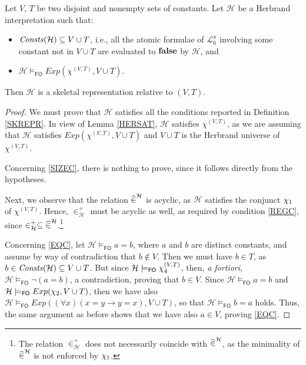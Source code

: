 \documentclass[manyauthors]{fundam}
\newcommand{\Elpizero}{\ensuremath{\mathcal{L}_{0}^{\pi}}\xspace}
\newcommand{\HExp}{Exp}
\newcommand{\memclosure}[1]{\in_{#1}^{+}}
\newcommand{\seteq}[2]{#1=#2}
\newcommand{\consta}{a}
\newcommand{\constb}{b}
\newcommand{\hinter}{\ensuremath{\mathcal{H}}}
\newcommand{\fomodels}[2]{#1 \models_{\mathsf{FO}} #2}
\begin{document}
\begin{lemma}\label{HERTOSK}
Let $V$, $T$ be two disjoint and nonempty sets of constants.
Let $\hinter$ be a Herbrand interpretation such that:
\begin{itemize}
  \item $\Consts(\hinter)\subseteq V \cup T$, i.e.,
  all the atomic formulae of $\Elpizero$ involving some constant not in
  $V \cup T$ are evaluated to $\mathbf{false}$ by $\hinter$, and
  \item $\fomodels{\hinter}{\HExp(\chi^{(V,T)}, V \cup T)}$.
\end{itemize}
Then $\hinter$ is a skeletal representation relative to $(V,T)$.
\end{lemma}
\begin{proof}
We must prove that $\hinter$ satisfies all the conditions
reported in Definition \ref{SKREPR}.
In view of Lemma
\ref{HERSAT},
$\hinter$ satisfies $\chi^{(V,T)}$, as we are assuming that
$\hinter$ satisfies $\HExp(\chi^{(V,T)}, V \cup T)$ and $V \cup T$ is
the Herbrand universe of $\chi^{(V,T)}$.

Concerning \ref{SIZEC}, there is nothing to prove, since it follows 
directly from the hypotheses.

Next, we observe that the relation $\memhatP^{\hinter}$ is acyclic,
as $\hinter$ satisfies the conjunct $\chi_1$ of $\chi^{(V,T)}$.
Hence, $\memclosure{\hinter}$ must be acyclic as well, as required by
condition \ref{REGC}, since $\memclosure{\hinter} \subseteq
\memhatP^{\hinter}$.\footnote{The relation $\memclosure{\hinter}$ does
not necessarily coincide with $\memhatP^{\hinter}$, as the minimality
of $\memhatP^{\hinter}$ is not enforced by $\chi_1$.}

Concerning \ref{EQC}, let 
$\fomodels{\hinter}{\seteq{\consta}{\constb}}$, where $a$ and $b$ are 
distinct constants, and assume by
way of contradiction that $\constb \notin V$. Then we must have 
$\constb \in T$, as $b \in \Consts(\hinter) \subseteq V \cup T$.
But since $\fomodels{\hinter}{\eqf}$, then, \emph{a fortiori}, 
$\fomodels{\hinter}{\neg(\seteq{\consta}{\constb})}$, a contradiction,
proving that $\constb \in V$. Since 
$\fomodels{\hinter}{\seteq{\consta}{\constb}}$ and 
$\fomodels{\hinter}{\HExp(\exonef, V \cup T)}$,
then we have also $\fomodels{\hinter}{\HExp((\forall x)(\seteq{x}{y} 
\rightarrow \seteq{y}{x}), V \cup T)}$, so
that $\fomodels{\hinter}{\seteq{\constb}{\consta}}$ holds. Thus, the 
same argument as before shows that we have also
$\consta \in V$, proving \ref{EQC}.


\end{proof}
\end{document}
